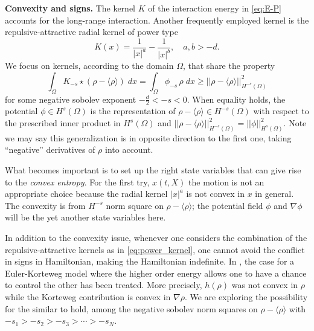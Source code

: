 \documentclass[a4paper,11pt]{article}
\begin{document}
{\bf Convexity and signs.}
The kernel $K$ of the interaction energy in \eqref{eq:E-P} accounts for the long-range interaction. Another frequently employed kernel is the repulsive-attractive radial kernel of power type
\begin{equation}
K(x) = \frac{1}{|x|^a} - \frac{1}{|x|^b}, \quad a,b>-d. \label{eq:power_kernel} 
\end{equation}
We focus on kernels, according to the domain $\Omega$, that share the property
$$ \int_\Omega K_{-s}\star(\rho-\langle\rho\rangle)\; dx =\int_\Omega \phi_{-s}\,\rho\; dx \ge ||\rho-\langle\rho\rangle||^2_{H^{-s}(\Omega)}$$%
for some negative sobolev exponent $-\frac{d}{2}<-s<0$. When equality holds, the potential $\phi\in H^s(\Omega)$ is the representation of $\rho-\langle\rho\rangle \in H^{-s}(\Omega)$ with respect to the prescribed inner product in $H^s(\Omega)$ and $||\rho-\langle\rho\rangle||^2_{H^{-s}(\Omega)}=||\phi||^2_{H^s(\Omega)}$. Note we may say this generalization is in opposite direction to the first one, taking ``negative'' derivatives of $\rho$ into account. 

What becomes important is to set up the right state variables that can give rise to the {\it convex entropy}. For the first try, $x(t,X)$ the motion is not an appropriate choice because the radial kernel $|x|^a$ is not convex in $x$ in general. The convexity is from $H^{-s}$ norm square on $\rho-\langle\rho\rangle$; the potential field $\phi$ and $\nabla \phi$ will be the yet another state variables here.  

In addition to the convexity issue, whenever one considers the combination of the repulsive-attractive kernels as in \eqref{eq:power_kernel}, one cannot avoid the conflict in signs in Hamiltonian, making the Hamiltonian indefinite.  In \cite{GTz}, the case for a Euler-Korteweg model where the higher order energy allows one to have a chance to control the other has been treated. More precisely, $h(\rho)$ was not convex in $\rho$ while the Korteweg contribution is convex in $\nabla\rho$. We are exploring the possibility for the similar to hold, among the negative sobolev norm squares on $\rho-\langle\rho\rangle$ with $-s_1 > -s_2 > -s_3 > \cdots > -s_N$.
\end{document}
